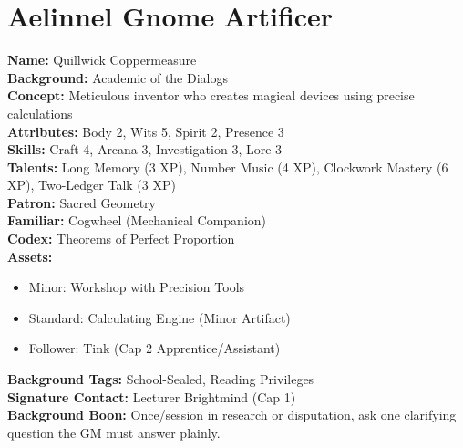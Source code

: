 \documentclass[11pt]{article}
\begin{document}
\section{Aelinnel Gnome Artificer}
\textbf{Name:} Quillwick Coppermeasure \\
\textbf{Background:} Academic of the Dialogs \\
\textbf{Concept:} Meticulous inventor who creates magical devices using precise calculations \\
\textbf{Attributes:} Body 2, Wits 5, Spirit 2, Presence 3 \\
\textbf{Skills:} Craft 4, Arcana 3, Investigation 3, Lore 3 \\
\textbf{Talents:} Long Memory (3 XP), Number Music (4 XP), Clockwork Mastery (6 XP), Two-Ledger Talk (3 XP) \\
\textbf{Patron:} Sacred Geometry \\
\textbf{Familiar:} Cogwheel (Mechanical Companion) \\
\textbf{Codex:} Theorems of Perfect Proportion \\
\textbf{Assets:}
\begin{itemize}
    \item Minor: Workshop with Precision Tools
    \item Standard: Calculating Engine (Minor Artifact)
    \item Follower: Tink (Cap 2 Apprentice/Assistant)
\end{itemize}
\textbf{Background Tags:} School-Sealed, Reading Privileges \\
\textbf{Signature Contact:} Lecturer Brightmind (Cap 1) \\
\textbf{Background Boon:} Once/session in research or disputation, ask one clarifying question the GM must answer plainly.
\end{document}
